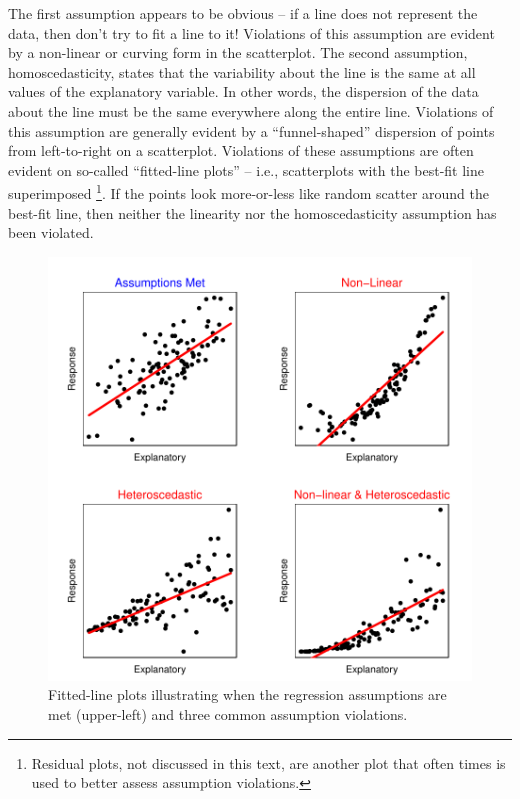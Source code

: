 \documentclass[10pt,openany]{book}\usepackage[]{graphicx}\usepackage[]{color}
\newenvironment{knitrout}{}{} %
\begin{document}
The first assumption appears to be obvious -- if a line does not represent the data, then don't try to fit a line to it!  Violations of this assumption are evident by a non-linear or curving form in the scatterplot.  The second assumption, homoscedasticity, states that the variability about the line is the same at all values of the explanatory variable. In other words, the dispersion of the data about the line must be the same everywhere along the entire line.  Violations of this assumption are generally evident by a ``funnel-shaped'' dispersion of points from left-to-right on a scatterplot.  Violations of these assumptions are often evident on so-called ``fitted-line plots'' -- i.e., scatterplots with the best-fit line superimposed \footnote{Residual plots, not discussed in this text, are another plot that often times is used to better assess assumption violations.}.  If the points look more-or-less like random scatter around the best-fit line, then neither the linearity nor the homoscedasticity assumption has been violated.

\begin{knitrout}
\color{fgcolor}\begin{figure}[hbtp]

{\centering \includegraphics[width=.8\linewidth]{Figs/ResidPlotEx-1} 

}

\caption[Fitted-line plots illustrating when the regression assumptions are met (upper-left) and three common assumption violations]{Fitted-line plots illustrating when the regression assumptions are met (upper-left) and three common assumption violations.}\label{fig:ResidPlotEx}
\end{figure}


\end{knitrout}
\end{document}
